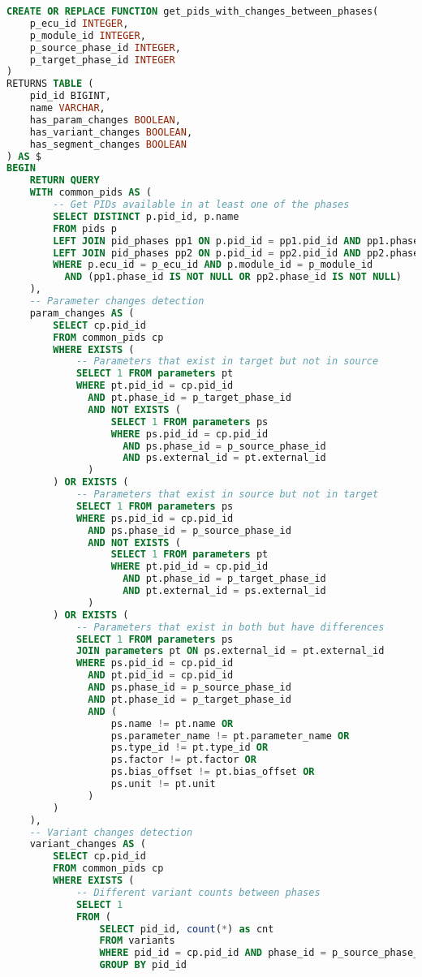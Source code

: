 \begin{lstlisting}[language=SQL, caption={Phase Comparison Function}, label={lst:phase-comparison}]
CREATE OR REPLACE FUNCTION get_pids_with_changes_between_phases(
    p_ecu_id INTEGER,
    p_module_id INTEGER,
    p_source_phase_id INTEGER,
    p_target_phase_id INTEGER
)
RETURNS TABLE (
    pid_id BIGINT,
    name VARCHAR,
    has_param_changes BOOLEAN,
    has_variant_changes BOOLEAN,
    has_segment_changes BOOLEAN
) AS $
BEGIN
    RETURN QUERY
    WITH common_pids AS (
        -- Get PIDs available in at least one of the phases
        SELECT DISTINCT p.pid_id, p.name
        FROM pids p
        LEFT JOIN pid_phases pp1 ON p.pid_id = pp1.pid_id AND pp1.phase_id = p_source_phase_id
        LEFT JOIN pid_phases pp2 ON p.pid_id = pp2.pid_id AND pp2.phase_id = p_target_phase_id
        WHERE p.ecu_id = p_ecu_id AND p.module_id = p_module_id
          AND (pp1.phase_id IS NOT NULL OR pp2.phase_id IS NOT NULL)
    ),
    -- Parameter changes detection
    param_changes AS (
        SELECT cp.pid_id
        FROM common_pids cp
        WHERE EXISTS (
            -- Parameters that exist in target but not in source
            SELECT 1 FROM parameters pt
            WHERE pt.pid_id = cp.pid_id
              AND pt.phase_id = p_target_phase_id
              AND NOT EXISTS (
                  SELECT 1 FROM parameters ps
                  WHERE ps.pid_id = cp.pid_id
                    AND ps.phase_id = p_source_phase_id
                    AND ps.external_id = pt.external_id
              )
        ) OR EXISTS (
            -- Parameters that exist in source but not in target
            SELECT 1 FROM parameters ps
            WHERE ps.pid_id = cp.pid_id
              AND ps.phase_id = p_source_phase_id
              AND NOT EXISTS (
                  SELECT 1 FROM parameters pt
                  WHERE pt.pid_id = cp.pid_id
                    AND pt.phase_id = p_target_phase_id
                    AND pt.external_id = ps.external_id
              )
        ) OR EXISTS (
            -- Parameters that exist in both but have differences
            SELECT 1 FROM parameters ps
            JOIN parameters pt ON ps.external_id = pt.external_id
            WHERE ps.pid_id = cp.pid_id
              AND pt.pid_id = cp.pid_id
              AND ps.phase_id = p_source_phase_id
              AND pt.phase_id = p_target_phase_id
              AND (
                  ps.name != pt.name OR
                  ps.parameter_name != pt.parameter_name OR
                  ps.type_id != pt.type_id OR
                  ps.factor != pt.factor OR
                  ps.bias_offset != pt.bias_offset OR
                  ps.unit != pt.unit
              )
        )
    ),
    -- Variant changes detection
    variant_changes AS (
        SELECT cp.pid_id
        FROM common_pids cp
        WHERE EXISTS (
            -- Different variant counts between phases
            SELECT 1
            FROM (
                SELECT pid_id, count(*) as cnt
                FROM variants
                WHERE pid_id = cp.pid_id AND phase_id = p_source_phase_id
                GROUP BY pid_id
                

\end{lstlisting}
